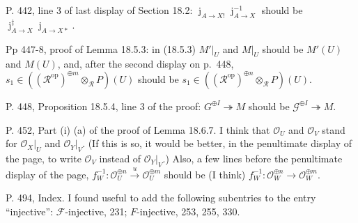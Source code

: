 \documentclass[12pt]{article}
\theoremstyle{remark}
\theoremstyle{definition}
\newcommand{\cc}{\mathcal}
\newcommand{\A}{\mathcal A}
\newcommand{\epi}{\twoheadrightarrow}
\newcommand{\oo}{\operatorname}
\newcommand{\xr}{\xrightarrow}
\DeclareMathOperator{\jj}{j}
\DeclareMathOperator{\op}{op}
\begin{document}

\noindent P. 442, line 3 of last display of Section 18.2: $\jj_{A\to X!}\jj_{A\to X}^{-1}$ should be $\jj_{A\to X}^\ddagger\jj_{A\to X*}$.

\noindent Pp 447-8, proof of Lemma 18.5.3: in (18.5.3) $M'|_U$ and $M|_U$ should be $M'(U)$ and $M(U)$, and, after the second display on p.~448, $s_1\in((\cc R^{\op})^{\oplus m}\otimes_{\cc R}P)(U)$ should be $s_1\in((\cc R^{\op})^{\oplus n}\otimes_{\cc R}P)(U)$.

\noindent P. 448, Proposition 18.5.4, line 3 of the proof: $G^{\oplus I}\epi M$ should be $\cc G^{\oplus I}\epi M$.

\noindent P. 452, Part (i) (a) of the proof of Lemma 18.6.7. I think that $\cc O_U$ and $\cc O_V$ stand for $\cc O_X|_U$ and $\cc O_Y|_V$. (If this is so, it would be better, in the penultimate display of the page, to write $\cc O_V$ instead of $\cc O_Y|_V$.) Also, a few lines before the penultimate display of the page, $f_W^{-1}:\cc O_U^{\oplus n}\xr u\cc O_U^{\oplus m}$ should be (I think) $f_W^{-1}:\cc O_W^{\oplus n}\to\cc O_W^{\oplus m}$.

\noindent P. 494, Index. I found useful to add the following subentries to the entry ``injective'': $\cc F$-injective, 231; $F$-injective, 253, 255, 330.
%
\end{document}
